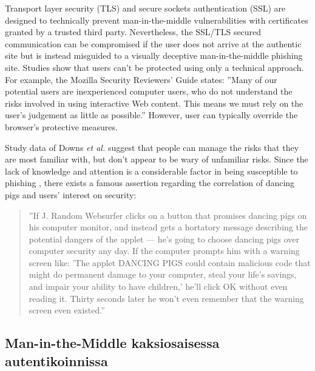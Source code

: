 \documentclass[english,gradu]{tktltiki}
\begin{document}
Transport layer security (TLS) and secure sockets authentication (SSL) are designed to technically prevent man-in-the-middle vulnerabilities with certificates granted by a trusted third party. Nevertheless, the SSL/TLS secured communication can be compromised if the user does not arrive at the authentic site but is instead misguided to a visually deceptive man-in-the-middle phishing site. Studies \cite{why_phishing_works_06, suspectibility_to_phishing_2006} show that users can't be protected using only a technical approach. For example, the Mozilla Security Reviewers' Guide \cite{mozilla_security_guide_2010} states: ''Many of our potential users are inexperienced computer users, who do not understand the risks involved in using interactive Web content. This means we must rely on the user's judgement as little as possible.'' However, user can typically override the browser's protective measures.

Study data of Downs \emph{et al.} \cite{suspectibility_to_phishing_2006} suggest that people can manage the risks that they are most familiar with, but don't appear to be wary of unfamiliar risks. Since the lack of knowledge and attention is a considerable factor in being susceptible to phishing \cite{why_phishing_works_06}, there exists a famous assertion regarding the correlation of dancing pigs and users' interest on security:

            \begin{quote}
              \label{quote:dancing_pigs}
              ''If J. Random Websurfer clicks on a button that promises dancing pigs on his computer monitor, and instead gets a hortatory message describing the potential dangers of the applet — he's going to choose dancing pigs over computer security any day. If the computer prompts him with a warning screen like: 'The applet DANCING PIGS could contain malicious code that might do permanent damage to your computer, steal your life's savings, and impair your ability to have children,' he'll click OK without even reading it. Thirty seconds later he won't even remember that the warning screen even existed.'' \cite{schneier_secrets_and_lies_2000}
            \end{quote}




\subsection{Man-in-the-Middle kaksiosaisessa autentikoinnissa} %
\label{sub:man_in_the_middle_kaksiosaisessa_autentikoinnissa}
\end{document}
